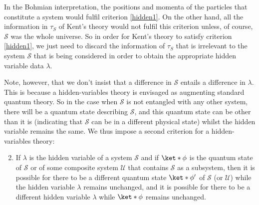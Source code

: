 \documentclass[12pt]{report}
\begin{document}
In the Bohmian interpretation, the positions and momenta of the particles that constitute a system would fulfil criterion \ref{hidden1}. On the other hand, all the information in $\tau_S$ of Kent's theory would not fulfil this criterion unless, of course, $\mathcal{S}$ was the whole universe. So in order for Kent's theory to satisfy criterion \ref{hidden1}, we just need to discard the information of $\tau_S$ that is irrelevant to the system $\mathcal{S}$ that is being considered in order to obtain the appropriate hidden variable data $\lambda$. 

Note, however, that we don't insist that a difference in $\mathcal{S}$ entails a difference in $\lambda$. This is because a hidden-variables theory is envisaged as augmenting standard quantum theory. So in the case when $\mathcal{S}$ is not entangled with any other system, there will be a quantum state describing $\mathcal{S}$, and this quantum state can be other than it is (indicating that $\mathcal{S}$ can be in a different physical state)  whilst the hidden variable remains the same. We thus impose a second criterion for a hidden-variables theory:
\begin{enumerate}
	\setcounter{enumi}{1}
	\item \label{hidden3} If $\lambda$ is the hidden variable of a system $\mathcal{S}$ and if $\ket*{\phi}$ is the quantum state of $\mathcal{S}$ or of some composite system $\mathcal{U}$ that contains $\mathcal{S}$ as a subsystem, then it is possible for there to be a different quantum state $\ket*{\phi'}$ of $\mathcal{S}$ (or $\mathcal{U}$) while the hidden variable $\lambda$ remains unchanged, and it is possible for there to be a different hidden variable $\lambda$ while $\ket*{\phi}$ remains unchanged.
\end{enumerate} 
\end{document}
